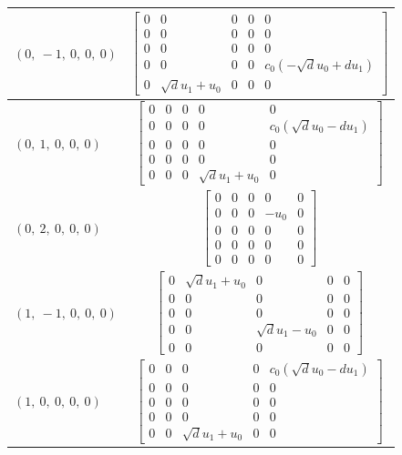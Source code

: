 \documentclass[11pt]{article}
\theoremstyle{definition}
\begin{document}
\begin{longtable}{|l|c|}
    \hline
    $\left( 0, \  -1, \  0, \  0, \  0\right)$ & ${\left[\begin{matrix}0 & 0 & 0 & 0 & 0\\0 & 0 & 0 & 0 & 0\\0 & 0 & 0 & 0 & 0\\0 & 0 & 0 & 0 & c_{0} \left(- \sqrt{d} u_{0} + d u_{1}\right)\\0 & \sqrt{d} u_{1} + u_{0} & 0 & 0 & 0\end{matrix}\right]}$ \\
    \hline
    $\left( 0, \  1, \  0, \  0, \  0\right)$ & ${\left[\begin{matrix}0 & 0 & 0 & 0 & 0\\0 & 0 & 0 & 0 & c_{0} \left(\sqrt{d} u_{0} - d u_{1}\right)\\0 & 0 & 0 & 0 & 0\\0 & 0 & 0 & 0 & 0\\0 & 0 & 0 & \sqrt{d} u_{1} + u_{0} & 0\end{matrix}\right]}$ \\
    \hline
    $\left( 0, \  2, \  0, \  0, \  0\right)$ & ${\left[\begin{matrix}0 & 0 & 0 & 0 & 0\\0 & 0 & 0 & - u_{0} & 0\\0 & 0 & 0 & 0 & 0\\0 & 0 & 0 & 0 & 0\\0 & 0 & 0 & 0 & 0\end{matrix}\right]}$ \\
    \hline
    $\left( 1, \  -1, \  0, \  0, \  0\right)$ & ${\left[\begin{matrix}0 & \sqrt{d} u_{1} + u_{0} & 0 & 0 & 0\\0 & 0 & 0 & 0 & 0\\0 & 0 & 0 & 0 & 0\\0 & 0 & \sqrt{d} u_{1} - u_{0} & 0 & 0\\0 & 0 & 0 & 0 & 0\end{matrix}\right]}$ \\
    \hline
    $\left( 1, \  0, \  0, \  0, \  0\right)$ & ${\left[\begin{matrix}0 & 0 & 0 & 0 & c_{0} \left(\sqrt{d} u_{0} - d u_{1}\right)\\0 & 0 & 0 & 0 & 0\\0 & 0 & 0 & 0 & 0\\0 & 0 & 0 & 0 & 0\\0 & 0 & \sqrt{d} u_{1} + u_{0} & 0 & 0\end{matrix}\right]}$ \\

\end{longtable}
\end{document}
